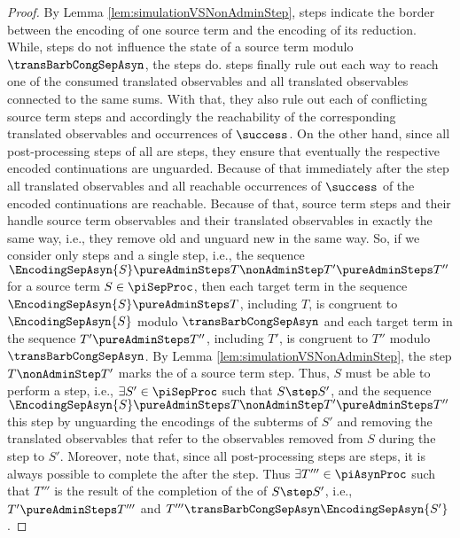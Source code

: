 \documentclass[]{llncs}
\begin{document}
\begin{proof}
	By Lemma \ref{lem:simulationVSNonAdminStep}, \nonAdmin steps indicate the border between the encoding of one source term and the encoding of its reduction. While, \pure \admin steps do not influence the state of a source term modulo $ \transBarbCongSepAsyn $, the \nonAdmin steps do. \NonAdmin steps finally rule out each way to reach one of the consumed translated observables and all translated observables connected to the same sums. With that, they also rule out each \simulation of conflicting source term steps and accordingly the reachability of the corresponding translated observables and occurrences of $ \success $. On the other hand, since all post-processing steps of all \simulations are \pure \admin steps, they ensure that eventually the respective encoded continuations are unguarded. Because of that immediately after the \nonAdmin step all translated observables and all reachable occurrences of $ \success $ of the encoded continuations are reachable. Because of that, source term steps and their \simulations handle source term observables and their translated observables in exactly the same way, i.e., they remove old and unguard new in the same way. So, if we consider only \pure \admin steps and a single \nonAdmin step, i.e., the sequence $ \EncodingSepAsyn{S} \pureAdminSteps T \nonAdminStep T' \pureAdminSteps T'' $ for a source term $ S \in \piSepProc $, then each target term in the sequence $ \EncodingSepAsyn{S} \pureAdminSteps T $, including $ T $, is congruent to $ \EncodingSepAsyn{S} $ modulo $ \transBarbCongSepAsyn $ and each target term in the sequence $ T' \pureAdminSteps T'' $, including $ T' $, is congruent to $ T'' $ modulo $ \transBarbCongSepAsyn $. By Lemma \ref{lem:simulationVSNonAdminStep}, the step $ T \nonAdminStep T' $ marks the \simulation of a source term step. Thus, $ S $ must be able to perform a step, i.e., $ \exists S' \in \piSepProc $ such that $ S \step S' $, and the sequence $ \EncodingSepAsyn{S} \pureAdminSteps T \nonAdminStep T' \pureAdminSteps T'' $ \simulates this step by unguarding the encodings of the subterms of $ S' $ and removing the translated observables that refer to the observables removed from $ S $ during the step to $ S' $. Moreover, note that, since all post-processing steps are \pure \admin steps, it is always possible to complete the \simulation after the \nonAdmin step. Thus $ \exists T''' \in \piAsynProc $ such that $ T''' $ is the result of the completion of the \simulation of $ S \step S' $, i.e., $ T' \pureAdminSteps T''' $ and $ T''' \transBarbCongSepAsyn \EncodingSepAsyn{S'} $.
	

\end{proof}
\end{document}
